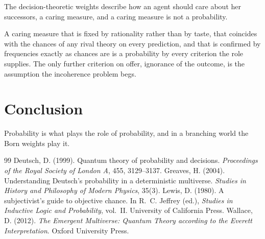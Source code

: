 \documentclass{situationist-preprint}
\begin{document}
\begin{objection}
The decision-theoretic weights describe how an agent should care about her successors, a caring measure, and a caring measure is not a probability.
\end{objection}

\begin{reply}
A caring measure that is fixed by rationality rather than by taste, that coincides with the chances of any rival theory on every prediction, and that is confirmed by frequencies exactly as chances are is a probability by every criterion the role supplies. The only further criterion on offer, ignorance of the outcome, is the assumption the incoherence problem begs.
\end{reply}

\section{Conclusion}

Probability is what plays the role of probability, and in a branching world the Born weights play it.

\begin{thebibliography}{99}\small
{} Deutsch, D. (1999). Quantum theory of probability and decisions. \emph{Proceedings of the Royal Society of London A}, 455, 3129--3137.
 Greaves, H. (2004). Understanding Deutsch's probability in a deterministic multiverse. \emph{Studies in History and Philosophy of Modern Physics}, 35(3).
 Lewis, D. (1980). A subjectivist's guide to objective chance. In R.~C. Jeffrey (ed.), \emph{Studies in Inductive Logic and Probability}, vol.~II. University of California Press.
 Wallace, D. (2012). \emph{The Emergent Multiverse: Quantum Theory according to the Everett Interpretation}. Oxford University Press.
\end{thebibliography}
\end{document}
